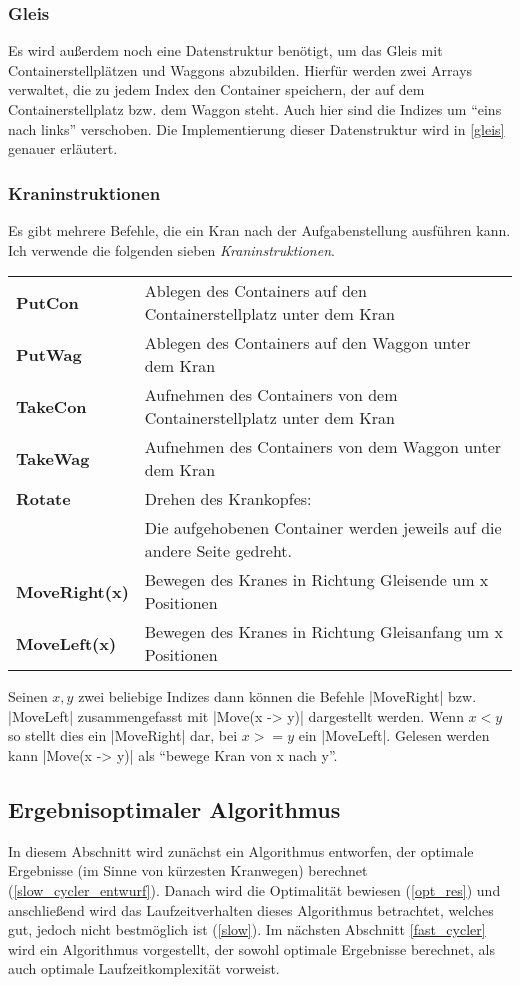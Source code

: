 \subsubsection{Gleis}
Es wird außerdem noch eine Datenstruktur benötigt, um das Gleis mit Containerstellplätzen und Waggons abzubilden.
Hierfür werden zwei Arrays verwaltet, die zu jedem Index den Container speichern, der auf dem Containerstellplatz bzw. dem Waggon steht.
Auch hier sind die Indizes um ``eins nach links'' verschoben.
Die Implementierung dieser Datenstruktur wird in \ref{gleis} genauer erläutert.
\subsubsection{Kraninstruktionen}
Es gibt mehrere Befehle, die ein Kran nach der Aufgabenstellung ausführen kann.
Ich verwende die folgenden sieben \emph{Kraninstruktionen}.

\begin{center}
\begin{tabular}{ll}
 \textbf{PutCon} & Ablegen des Containers auf den Containerstellplatz unter dem Kran \\
 \textbf{PutWag} & Ablegen des Containers auf den Waggon unter dem Kran \\
 \textbf{TakeCon} & Aufnehmen des Containers von dem Containerstellplatz unter dem Kran \\
 \textbf{TakeWag} & Aufnehmen des Containers von dem Waggon unter dem Kran \\
 \textbf{Rotate} & Drehen des Krankopfes: \\
                 & Die aufgehobenen Container werden jeweils auf die andere Seite gedreht. \\
 \textbf{MoveRight(x)} & Bewegen des Kranes in Richtung Gleisende um x Positionen \\
 \textbf{MoveLeft(x)}  & Bewegen des Kranes in Richtung Gleisanfang um x Positionen \\
\end{tabular}
\end{center}

Seinen $x,y$ zwei beliebige Indizes dann können die Befehle |MoveRight| bzw. |MoveLeft| zusammengefasst mit |Move(x -> y)| dargestellt werden.
Wenn $x < y$ so stellt dies ein |MoveRight| dar, bei $x >= y$ ein |MoveLeft|.
Gelesen werden kann |Move(x -> y)| als ``bewege Kran von x nach y''.

\subsection{Ergebnisoptimaler Algorithmus}
\label{slow_cycler}
In diesem Abschnitt wird zunächst ein Algorithmus entworfen, der optimale Ergebnisse (im Sinne von kürzesten Kranwegen) berechnet (\ref{slow_cycler_entwurf}).
Danach wird die Optimalität bewiesen (\ref{opt_res}) und anschließend wird das Laufzeitverhalten dieses Algorithmus betrachtet, welches gut, jedoch nicht bestmöglich ist (\ref{slow}).
Im nächsten Abschnitt \ref{fast_cycler} wird ein Algorithmus vorgestellt, der sowohl optimale Ergebnisse berechnet, als auch optimale Laufzeitkomplexität vorweist.
